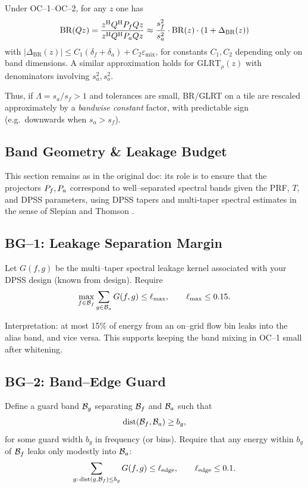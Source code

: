 Under OC--1--OC--2, for any $z$ one has
\[
\mathrm{BR}(Qz) = \frac{z^{\mathrm{H}} Q^{\mathrm{H}} P_f Q z}{z^{\mathrm{H}} Q^{\mathrm{H}} P_a Q z}
  \approx \frac{s_f^2}{s_a^2} \cdot \mathrm{BR}(z) \cdot (1+\Delta_{\text{BR}}(z))
\]
with $|\Delta_{\text{BR}}(z)| \le C_1(\delta_f+\delta_a) + C_2 \varepsilon_{\text{mix}}$, for constants $C_1,C_2$ depending only on band dimensions. A similar approximation holds for $\mathrm{GLRT}_\rho(z)$ with denominators involving $s_a^2,s_o^2$.

Thus, if $\Lambda = s_a/s_f>1$ and tolerances are small, BR/GLRT on a tile are rescaled approximately by a \emph{bandwise constant} factor, with predictable sign (e.g.\ downwards when $s_a>s_f$).

\subsection{Band Geometry \& Leakage Budget}
\label{app:ka-band-geometry}

This section remains as in the original doc: its role is to ensure that the projectors $P_f,P_a$ correspond to well--separated spectral bands given the PRF, $T$, and DPSS parameters, using DPSS tapers and multi-taper spectral estimates in the sense of Slepian and Thomson \cite{SlepianDPSS1978,ThomsonMTM1982,PercivalWaldenSAPABook1993}.

\subsection{BG--1: Leakage Separation Margin}

Let $G(f,g)$ be the multi--taper spectral leakage kernel associated with your DPSS design (known from design). Require
\[
\max_{f\in\mathcal{B}_f} \sum_{g\in\mathcal{B}_a} G(f,g) \le \ell_{\max},\qquad \ell_{\max} \le 0.15.
\]

Interpretation: at most 15\% of energy from an on--grid flow bin leaks into the alias band, and vice versa. This supports keeping the band mixing in OC--1 small after whitening.

\subsection{BG--2: Band--Edge Guard}

Define a guard band $\mathcal{B}_g$ separating $\mathcal{B}_f$ and $\mathcal{B}_a$ such that
\[
\mathrm{dist}(\mathcal{B}_f,\mathcal{B}_a) \ge b_g,
\]
for some guard width $b_g$ in frequency (or bins). Require that any energy within $b_g$ of $\mathcal{B}_f$ leaks only modestly into $\mathcal{B}_a$:
\[
\sum_{g:\,\mathrm{dist}(g,\mathcal{B}_f)\le b_g} G(f,g) \le \ell_{\text{edge}},\qquad \ell_{\text{edge}}\le 0.1.
\]


